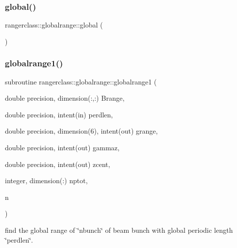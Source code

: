 \subsubsection{\texorpdfstring{global()}{global()}}
{\footnotesize\ttfamily rangerclass\+::globalrange\+::global (\begin{DoxyParamCaption}{ }\end{DoxyParamCaption})}

\mbox{\label{interfacerangerclass_1_1globalrange_a7ff5a58a120be444ab81bf7037c3785a}} 
\subsubsection{\texorpdfstring{globalrange1()}{globalrange1()}}
{\footnotesize\ttfamily subroutine rangerclass\+::globalrange\+::globalrange1 (\begin{DoxyParamCaption}\item[{double precision, dimension(\+:,\+:)}]{Brange,  }\item[{double precision, intent(in)}]{perdlen,  }\item[{double precision, dimension(6), intent(out)}]{grange,  }\item[{double precision, intent(out)}]{gammaz,  }\item[{double precision, intent(out)}]{zcent,  }\item[{integer, dimension(\+:)}]{nptot,  }\item[{}]{n }\end{DoxyParamCaption})}



find the global range of \char`\"{}nbunch\char`\"{} of beam bunch with global periodic length \char`\"{}perdlen\char`\"{}. 

\mbox{\label{interfacerangerclass_1_1globalrange_afead53eaf233bc999c94bcaf916eaaf8}} 
